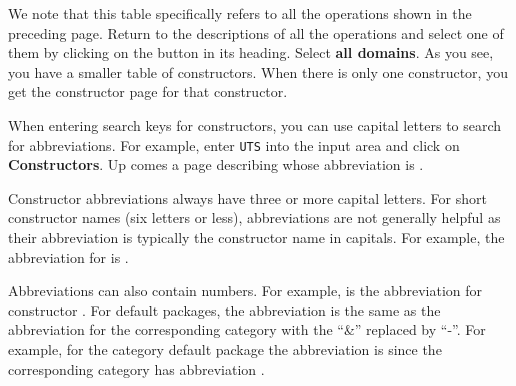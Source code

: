 {We note that this table specifically refers to all the 
operations shown in the preceding page.
Return to the descriptions of all the  operations and
select one of them by clicking on the button in its heading.
Select {\bf all domains}.
As you see, you have a smaller table of constructors.
When there is only one constructor, you get the
constructor page for that constructor.
\newpage


When entering search keys for constructors, you can use capital
letters to search for abbreviations.
For example, enter {\tt UTS} into the input area and click on {\bf
Constructors}.
Up comes a page describing 
whose abbreviation is .

Constructor abbreviations always have three or more capital
letters.
For short constructor names (six letters or less), abbreviations
are not generally helpful as their abbreviation is typically the
constructor name in capitals.
For example, the abbreviation for  is
.

Abbreviations can also contain numbers.
For example,  is the abbreviation for constructor
.
For default packages, the abbreviation is the same as the
abbreviation for the corresponding category with the ``\&''
replaced by ``-''.
For example, for the category default package
 the abbreviation is
 since the corresponding category
 has abbreviation .

}
